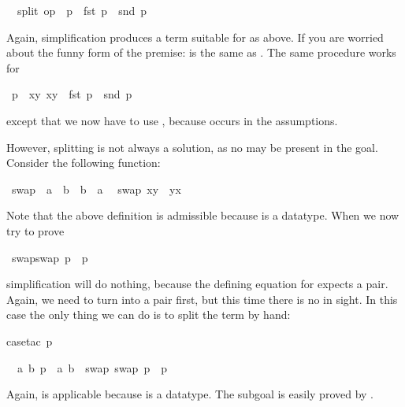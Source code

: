 \begin{isabellebody}
\begin{isamarkuptxt}
\begin{isabelle}%
\ {}{\isachardot}\ split\ op\ {\isacharequal}\ p\ {\isasymlongrightarrow}\ fst\ p\ {\isacharequal}\ snd\ p%
\end{isabelle}
Again, simplification produces a term suitable for 
as above. If you are worried about the funny form of the premise:
 is the same as .
The same procedure works for%
\end{isamarkuptxt}%
\ {\isachardoublequote}p\ {\isasymin}\ {\isacharbraceleft}{\isacharparenleft}x{\isacharcomma}y{\isacharparenright}{\isachardot}\ x{\isacharequal}y{\isacharbraceright}\ {\isasymLongrightarrow}\ fst\ p\ {\isacharequal}\ snd\ p{\isachardoublequote}%
\begin{isamarkuptxt}%
\noindent
except that we now have to use , because
 occurs in the assumptions.

However, splitting  is not always a solution, as no 
may be present in the goal. Consider the following function:%
\end{isamarkuptxt}%
\ swap\ {\isacharcolon}{\isacharcolon}\ {\isachardoublequote}{\isacharprime}a\ {\isasymtimes}\ {\isacharprime}b\ {\isasymRightarrow}\ {\isacharprime}b\ {\isasymtimes}\ {\isacharprime}a{\isachardoublequote}\isanewline
{}\isanewline
\ \ {\isachardoublequote}swap\ {\isacharparenleft}x{\isacharcomma}y{\isacharparenright}\ {\isacharequal}\ {\isacharparenleft}y{\isacharcomma}x{\isacharparenright}{\isachardoublequote}%
\begin{isamarkuptext}%
\noindent
Note that the above  definition is admissible
because \isa{{\isasymtimes}} is a datatype. When we now try to prove%
\end{isamarkuptext}%
\ {\isachardoublequote}swap{\isacharparenleft}swap\ p{\isacharparenright}\ {\isacharequal}\ p{\isachardoublequote}%
\begin{isamarkuptxt}%
\noindent
simplification will do nothing, because the defining equation for 
expects a pair. Again, we need to turn  into a pair first, but this
time there is no  in sight. In this case the only thing we can do
is to split the term by hand:%
\end{isamarkuptxt}%
case{\isacharunderscore}tac\ p{\isacharparenright}%
\begin{isamarkuptxt}%
\noindent
\begin{isabelle}%
\ {}{\isachardot}\ {\isasymAnd}a\ b{\isachardot}\ p\ {\isacharequal}\ {\isacharparenleft}a{\isacharcomma}\ b{\isacharparenright}\ {\isasymLongrightarrow}\ swap\ {\isacharparenleft}swap\ p{\isacharparenright}\ {\isacharequal}\ p%
\end{isabelle}
Again,  is applicable because \isa{{\isasymtimes}} is a datatype.
The subgoal is easily proved by .


\end{isamarkuptxt}
\end{isabellebody}
